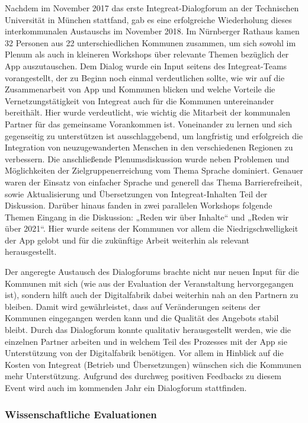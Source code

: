 \documentclass[12pt, a4paper]{article} %
\begin{document}
Nachdem im November 2017 das erste Integreat-Dialogforum an der
Technischen Universität in München stattfand, gab es eine erfolgreiche
Wiederholung dieses interkommunalen Austauschs im November 2018. Im
Nürnberger Rathaus kamen 32 Personen aus 22 unterschiedlichen Kommunen
zusammen, um sich sowohl im Plenum als auch in kleineren Workshops über
relevante Themen bezüglich der App auszutauschen. Dem Dialog wurde ein
Input seitens des Integreat-Teams vorangestellt, der zu Beginn noch
einmal verdeutlichen sollte, wie wir auf die Zusammenarbeit von App und
Kommunen blicken und welche Vorteile die Vernetzungstätigkeit von
Integreat auch für die Kommunen untereinander bereithält. Hier wurde
verdeutlicht, wie wichtig die Mitarbeit der kommunalen Partner für das
gemeinsame Vorankommen ist. Voneinander zu lernen und sich gegenseitig
zu unterstützen ist ausschlaggebend, um langfristig und erfolgreich die
Integration von neuzugewanderten Menschen in den verschiedenen Regionen
zu verbessern. Die anschließende Plenumsdiskussion wurde neben Problemen
und Möglichkeiten der Zielgruppenerreichung vom Thema Sprache dominiert.
Genauer waren der Einsatz von einfacher Sprache und generell das Thema
Barrierefreiheit, sowie Aktualisierung und Übersetzungen von
Integreat-Inhalten Teil der Diskussion. Darüber hinaus fanden in zwei
parallelen Workshops folgende Themen Eingang in die Diskussion: „Reden
wir über Inhalte“ und „Reden wir über 2021“. Hier wurde seitens der
Kommunen vor allem die Niedrigschwelligkeit der App gelobt und für die
zukünftige Arbeit weiterhin als relevant herausgestellt.

Der angeregte Austausch des Dialogforums brachte nicht nur neuen Input
für die Kommunen mit sich (wie aus der Evaluation der Veranstaltung
hervorgegangen ist), sondern hilft auch der Digitalfabrik dabei
weiterhin nah an den Partnern zu bleiben. Damit wird gewährleistet, dass
auf Veränderungen seitens der Kommunen eingegangen werden kann und die
Qualität des Angebots stabil bleibt. Durch das Dialogforum konnte
qualitativ herausgestellt werden, wie die einzelnen Partner arbeiten und
in welchem Teil des Prozesses mit der App sie Unterstützung von der
Digitalfabrik benötigen. Vor allem in Hinblick auf die Kosten von
Integreat (Betrieb und Übersetzungen) wünschen sich die Kommunen mehr
Unterstützung. Aufgrund des durchweg positiven Feedbacks zu diesem Event
wird auch im kommenden Jahr ein Dialogforum stattfinden.

\hypertarget{wissenschaftliche-evaluationen}{%
\subsubsection{Wissenschaftliche
Evaluationen}\label{wissenschaftliche-evaluationen}}
\end{document}
